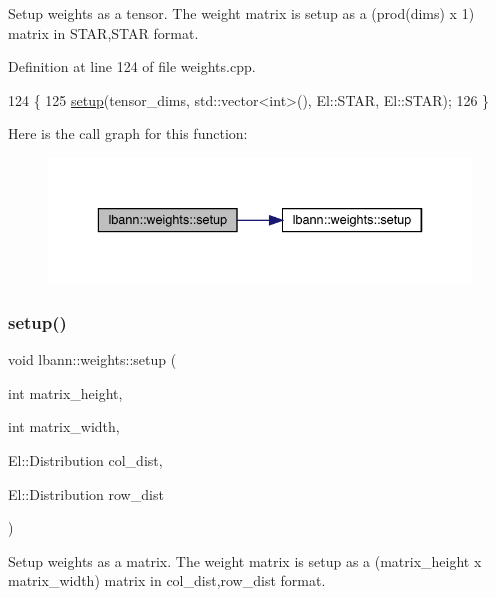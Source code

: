 Setup weights as a tensor. The weight matrix is setup as a (prod(dims) x 1) matrix in S\+T\+AR,S\+T\+AR format. 

Definition at line 124 of file weights.\+cpp.


\begin{DoxyCode}
124                                               \{
125   \hyperlink{classlbann_1_1weights_a476989a30cbe62ab2f680235981c3ba5}{setup}(tensor\_dims, std::vector<int>(), El::STAR, El::STAR);
126 \}
\end{DoxyCode}
Here is the call graph for this function\+:\nopagebreak
\begin{figure}[H]
\begin{center}
\leavevmode
\includegraphics[width=336pt]{classlbann_1_1weights_a64037919e22272a8931da328f0b2494a_cgraph}
\end{center}
\end{figure}
\mbox{\label{classlbann_1_1weights_aacf5c30b815e2f1c47a33043e440ed65}} 
\subsubsection{\texorpdfstring{setup()}{setup()}\hspace{0.1cm}{\footnotesize\ttfamily [3/4]}}
{\footnotesize\ttfamily void lbann\+::weights\+::setup (\begin{DoxyParamCaption}\item[{int}]{matrix\+\_\+height,  }\item[{int}]{matrix\+\_\+width,  }\item[{El\+::\+Distribution}]{col\+\_\+dist,  }\item[{El\+::\+Distribution}]{row\+\_\+dist }\end{DoxyParamCaption})\hspace{0.3cm}{\ttfamily [virtual]}}

Setup weights as a matrix. The weight matrix is setup as a (matrix\+\_\+height x matrix\+\_\+width) matrix in col\+\_\+dist,row\+\_\+dist format. 

